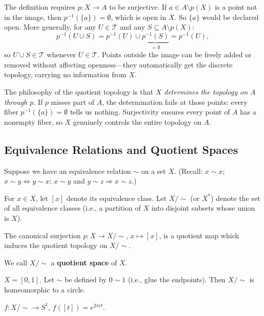 \documentclass[11pt]{report}
\begin{document}
\begin{rembox}
The definition requires $p: X \to A$ to be surjective. If $a \in A \setminus p(X)$ is a point not in the image, then $p^{-1}(\{a\}) = \emptyset$, which is open in $X$. So $\{a\}$ would be declared open. More generally, for any $U \in \mathcal{T}$ and any $S \subseteq A \setminus p(X)$:
\[p^{-1}(U \cup S) = p^{-1}(U) \cup \underbrace{p^{-1}(S)}_{= \emptyset} = p^{-1}(U),\]
so $U \cup S \in \mathcal{T}$ whenever $U \in \mathcal{T}$. Points outside the image can be freely added or removed without affecting openness---they automatically get the discrete topology, carrying no information from $X$.

The philosophy of the quotient topology is that \emph{$X$ determines the topology on $A$ through $p$}. If $p$ misses part of $A$, the determination fails at those points: every fiber $p^{-1}(\{a\}) = \emptyset$ tells us nothing. Surjectivity ensures every point of $A$ has a nonempty fiber, so $X$ genuinely controls the entire topology on $A$.
\end{rembox}

\subsection{Equivalence Relations and Quotient Spaces}

\begin{defbox}
Suppose we have an equivalence relation $\sim$ on a set $X$. (Recall: $x \sim x$; $x \sim y \Leftrightarrow y \sim x$; $x \sim y$ and $y \sim z \Rightarrow x \sim z$.)

For $x \in X$, let $[x]$ denote its equivalence class. Let $X/{\sim}$ (or $X^*$) denote the set of all equivalence classes (i.e., a partition of $X$ into disjoint subsets whose union is $X$).

The canonical surjection $p: X \to X/{\sim}$, $x \mapsto [x]$, is a quotient map which induces the quotient topology on $X/{\sim}$.

We call $X/{\sim}$ a \textbf{quotient space} of $X$.
\end{defbox}

\begin{exbox}
$X = [0, 1]$. Let $\sim$ be defined by $0 \sim 1$ (i.e., glue the endpoints). Then $X/{\sim}$ is homeomorphic to a circle.

$f: X/{\sim} \to S^1$, $f([t]) = e^{2\pi i t}$.
\end{exbox}
\end{document}
